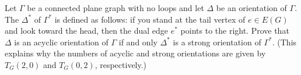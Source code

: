 \prob Let $\Gamma$ be a connected plane graph with no loops and let $\Delta$ be an orientation of $\Gamma$.  The  $\Delta^*$ of $\Gamma^*$ is defined as follows: if you stand at the tail vertex of $e\in E(G)$ and look toward the head, then the dual edge $e^*$ points to the right.
Prove that $\Delta$ is an acyclic orientation of $\Gamma$ if and only $\Delta^*$ is a strong orientation of $\Gamma^*$.  (This explains why the numbers of acyclic and strong orientations are given by $T_G(2,0)$ and $T_G(0,2)$, respectively.)

